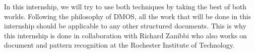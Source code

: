 \documentclass[11pt]{sdm}
\begin{document}
In this internship, we will try to use both techniques by taking the best of both worlds.
Following the philosophy of DMOS, all the work that will be done in this internship should be applicable to any other structured documents.
This is why this internship is done in collaboration with Richard Zanibbi who also works on document and pattern recognition at the Rochester Institute of Technology.




\end{document}
